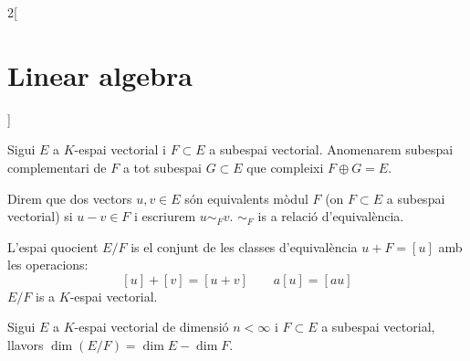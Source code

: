 \documentclass[../../../main.tex]{subfiles}
\begin{document}
\begin{multicols}{2}[\section{Linear algebra}]
\begin{definition}
Sigui $E$ a $K$-espai vectorial i $F\subset E$ a subespai vectorial. Anomenarem subespai complementari de $F$ a tot subespai $G\subset E$ que compleixi $F\oplus G=E$.
\end{definition}
\begin{definition}
Direm que dos vectors $u,v\in E$ són equivalents mòdul $F$ (on $F\subset E$ a subespai vectorial) si $u-v\in F$ i escriurem $u\sim_Fv$. $\sim_F$ is a relació d'equivalència.
\end{definition}
\begin{definition}
L'espai quocient $E/F$ is el conjunt de les classes d'equivalència $u+F=[u]$ amb les operacions:
$$[u]+[v]=[u+v]\qquad a[u]=[au]$$ $E/F$ is a $K$-espai vectorial.
\end{definition}
\begin{prop}
Sigui $E$ a $K$-espai vectorial de dimensió $n<\infty$ i $F\subset E$ a subespai vectorial, llavors $\dim (E/F)=\dim E-\dim F$.
\end{prop}

\end{multicols}
\end{document}
